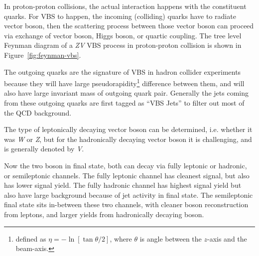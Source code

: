 In proton-proton collisions, the actual interaction happens
with the constituent quarks. For \gls{VBS} to happen, the incoming
(colliding) quarks have to radiate vector boson, then the scattering
process between those vector boson can proceed via exchange of vector
boson, Higgs boson, or quartic coupling. The tree level Feynman
diagram of a \textit{ZV} VBS process in proton-proton
collision is shown in Figure~\ref{fig:feynman-vbs}.

The outgoing quarks are the signature of \gls{VBS} in hadron collider
experiments because they will have large pseudorapidity\footnote{
  defined as \(\eta = - \ln[\tan \theta/2]\), where \(\theta \) is angle
  between the \(z\)-axis and the beam-axis. }
difference between
them, and will also have large invariant mass of outgoing quark pair.
Generally the jets
coming from these outgoing quarks are first tagged
as ``VBS Jets'' to filter out most of the \gls{QCD} background.

The type of leptonically decaying
vector boson can be determined, i.e.
whether it was \textit{W} or \textit{Z},
but for the hadronically decaying vector
boson it is challenging, and is generally denoted by \textit{V}.


Now the two boson
in final state, both can decay via fully leptonic or hadronic,
or semileptonic channels.
The fully leptonic channel has cleanest signal, but also has
lower signal yield. The fully hadronic channel has highest
signal yield but also have large background because of jet activity
in final state.
The semileptonic final state sits in-between these two channels,
with cleaner boson reconstruction from leptons, and larger yields
from hadronically decaying boson.


